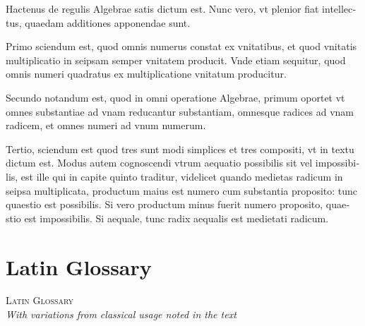\documentclass[11pt,a4paper]{book}
\begin{document}
\textlatin{Hactenus de regulis Algebrae satis dictum est. Nunc vero, vt plenior fiat intellectus, quaedam additiones apponendae sunt.}

\textlatin{Primo sciendum est, quod omnis numerus constat ex vnitatibus, et quod vnitatis multiplicatio in seipsam semper vnitatem producit. Vnde etiam sequitur, quod omnis numeri quadratus ex multiplicatione vnitatum producitur.}

\textlatin{Secundo notandum est, quod in omni operatione Algebrae, primum oportet vt omnes substantiae ad vnam reducantur substantiam, omnesque radices ad vnam radicem, et omnes numeri ad vnum numerum.}

\textlatin{Tertio, sciendum est quod tres sunt modi simplices et tres compositi, vt in textu dictum est. Modus autem cognoscendi vtrum aequatio possibilis sit vel impossibilis, est ille qui in capite quinto traditur, videlicet quando medietas radicum in seipsa multiplicata, productum maius est numero cum substantia proposito: tunc quaestio est possibilis. Si vero productum minus fuerit numero proposito, quaestio est impossibilis. Si aequale, tunc radix aequalis est medietati radicum.}

\vspace{1cm}

\part*{Latin Glossary}

\begin{center}
\textsc{Latin Glossary}\\
\textit{With variations from classical usage noted in the text}
\end{center}
\end{document}
